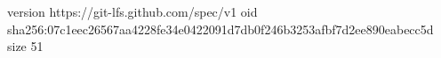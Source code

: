 version https://git-lfs.github.com/spec/v1
oid sha256:07c1eec26567aa4228fe34e0422091d7db0f246b3253afbf7d2ee890eabecc5d
size 51
